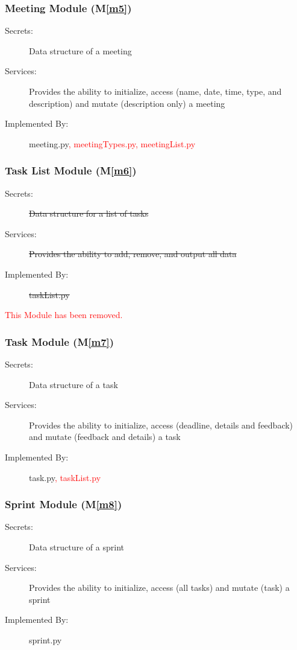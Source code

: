 \documentclass[12pt, titlepage]{article}
\newcommand{\mref}[1]{M\ref{#1}}
\begin{document}
\subsubsection{Meeting Module (\mref{m5})}
\begin{description}
    \item[Secrets:] Data structure of a meeting
    \item[Services:] Provides the ability to initialize, access (name, date, time, type, and description) and mutate (description only) a meeting
    \item[Implemented By:] meeting.py\textcolor{red}{, meetingTypes.py, meetingList.py}
\end{description}

\subsubsection{Task List Module (\mref{m6})}
\begin{description}
    \item[Secrets:] \sout{Data structure for a list of tasks}
    \item[Services:] \sout{Provides the ability to add, remove, and output all data}
    \item[Implemented By:] \sout{taskList.py}
\end{description}
\textcolor{red}{This Module has been removed.}

\subsubsection{Task Module (\mref{m7})}
\begin{description}
    \item[Secrets:] Data structure of a task
    \item[Services:] Provides the ability to initialize, access (deadline, details and feedback) and mutate (feedback and details) a task
    \item[Implemented By:] task.py\textcolor{red}{, taskList.py}
\end{description}

\subsubsection{Sprint Module (\mref{m8})}
\begin{description}
    \item[Secrets:] Data structure of a sprint
    \item[Services:] Provides the ability to initialize, access (all tasks) and mutate (task) a sprint
    \item[Implemented By:] sprint.py
\end{description}
\end{document}

